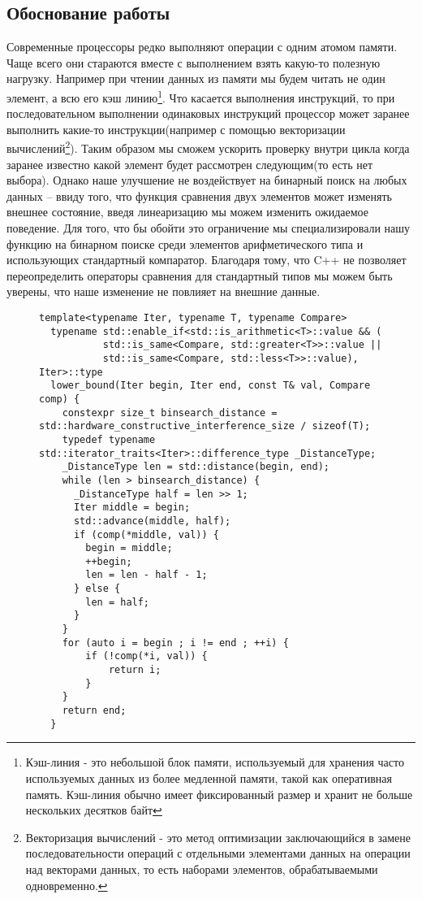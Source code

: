 \subsection{Обоснование работы}
\par{Современные процессоры редко выполняют операции с одним атомом памяти. Чаще всего они стараются вместе с выполнением взять какую-то полезную нагрузку. Например при чтении данных из памяти мы будем читать не один элемент, а всю его кэш линию\footnote{Кэш-линия - это небольшой блок памяти, используемый для хранения часто используемых данных из более медленной памяти, такой как оперативная память. Кэш-линия обычно имеет фиксированный размер и хранит не больше нескольких десятков байт}. Что касается выполнения инструкций, то при последовательном выполнении одинаковых инструкций процессор может заранее выполнить какие-то инструкции(например с помощью векторизации вычислений\footnote{Векторизация вычислений - это метод оптимизации заключающийся в замене последовательности операций с отдельными элементами данных на операции над векторами данных, то есть наборами элементов, обрабатываемыми одновременно.}). Таким образом мы сможем ускорить проверку внутри цикла когда заранее известно какой элемент будет рассмотрен следующим(то есть нет выбора). Однако наше улучшение не воздействует на бинарный поиск на любых данных -- ввиду того, что функция сравнения двух элементов может изменять внешнее состояние, введя линеаризацию мы можем изменить ожидаемое поведение. Для того, что бы обойти это ограничение мы специализировали нашу функцию на бинарном поиске среди элементов арифметического типа и использующих стандартный компаратор. Благодаря тому, что C++ не позволяет переопределить операторы сравнения для стандартный типов мы можем быть уверены, что наше изменение не повлияет на внешние данные. 
}
\begin{figure}[t]
\begin{lstlisting}[caption={Предложенное изменения бинарного поиска}, label={listing::binary_search}]
  template<typename Iter, typename T, typename Compare>
  typename std::enable_if<std::is_arithmetic<T>::value && (
           std::is_same<Compare, std::greater<T>>::value ||
           std::is_same<Compare, std::less<T>>::value), Iter>::type 
  lower_bound(Iter begin, Iter end, const T& val, Compare comp) {
    constexpr size_t binsearch_distance = std::hardware_constructive_interference_size / sizeof(T); 
    typedef typename std::iterator_traits<Iter>::difference_type _DistanceType;
    _DistanceType len = std::distance(begin, end);
    while (len > binsearch_distance) {
      _DistanceType half = len >> 1;
      Iter middle = begin;
      std::advance(middle, half);
      if (comp(*middle, val)) {
        begin = middle;
        ++begin;
        len = len - half - 1;
      } else {
        len = half;
      }
    }
    for (auto i = begin ; i != end ; ++i) {
        if (!comp(*i, val)) {
            return i;
        }
    }
    return end;
  }
\end{lstlisting}
\end{figure}
